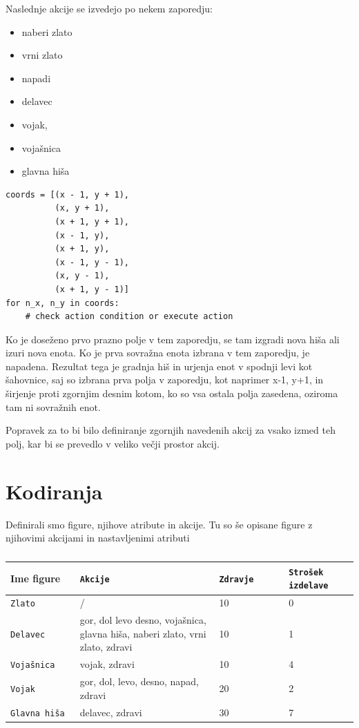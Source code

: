 \documentclass[a4paper, 12pt]{book}
\begin{document}
Naslednje akcije se izvedejo po nekem zaporedju:
\begin{itemize}
	\item naberi zlato
	\item vrni zlato
	\item napadi
	\item delavec
	\item vojak, 
	\item vojašnica
	\item glavna hiša
\end{itemize}
\begin{verbatim}
coords = [(x - 1, y + 1),
          (x, y + 1),
          (x + 1, y + 1),
          (x - 1, y),
          (x + 1, y),
          (x - 1, y - 1),
          (x, y - 1),
          (x + 1, y - 1)]
for n_x, n_y in coords:
    # check action condition or execute action
\end{verbatim}
Ko je doseženo prvo prazno polje v tem zaporedju, se tam izgradi nova hiša ali izuri nova enota.
Ko je prva sovražna enota izbrana v tem zaporedju, je napadena.
Rezultat tega je gradnja hiš in urjenja enot v spodnji levi kot šahovnice, saj so izbrana prva polja v zaporedju, kot naprimer x-1, y+1, in širjenje proti zgornjim desnim kotom, ko so vsa ostala polja zasedena, oziroma tam ni sovražnih enot.

Popravek za to bi bilo definiranje zgornjih navedenih akcij za vsako izmed teh polj, kar bi se prevedlo v veliko večji prostor akcij.

\section{Kodiranja}

Definirali smo figure, njihove atribute in akcije. Tu so še opisane figure z njihovimi akcijami in nastavljenimi atributi
\begin{table}
\label{tabelfigures}
	\begin{center}
		
	\begin{tabular}{p{0.2\linewidth}|p{0.4\linewidth}|p{0.2\linewidth}|p{0.2\linewidth}}
		Ime figure & {\tt Akcije} & {\tt Zdravje} & {\tt Strošek izdelave} \\ \hline
		{\tt Zlato} & / & 10 & 0 \\
		{\tt Delavec}   & gor, dol levo desno, vojašnica, glavna hiša, naberi zlato, vrni zlato, zdravi & 10  & 1 \\
		{\tt Vojašnica}   & vojak, zdravi & 10  & 4 \\
		{\tt Vojak}   & gor, dol, levo, desno, napad, zdravi  & 20 & 2 \\
		{\tt Glavna hiša}   & delavec, zdravi & 30  & 7 \\
	\end{tabular}


	\end{center}
	\caption{}
	\label{tbl:1}
\end{table}
\end{document}
